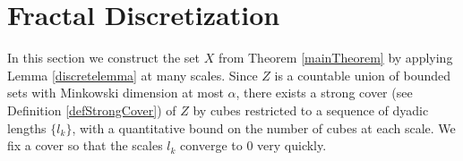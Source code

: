 \section{Fractal Discretization}\label{discretizationsection}

In this section we construct the set $X$ from Theorem \ref{mainTheorem} by applying Lemma \ref{discretelemma} at many scales. Since $Z$ is a countable union of bounded sets with Minkowski dimension at most $\alpha$, there exists a strong cover (see Definition \ref{defStrongCover}) of $Z$ by cubes restricted to a sequence of dyadic lengths $\{ l_k \}$, with a quantitative bound on the number of cubes at each scale. We fix a cover so that the scales $l_k$ converge to $0$ very quickly.


